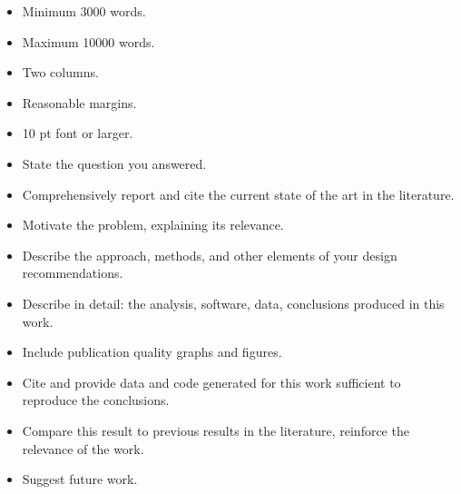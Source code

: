 \documentclass[12pts, answers]{exam}
\begin{document}
\begin{questions}
\begin{itemize}
\item Minimum 3000 words.
\item Maximum 10000 words.
\item Two columns.
\item Reasonable margins.
\item 10 pt font or larger.
\item State the question you answered.
\item Comprehensively report and cite the current state of the art in the literature.
\item Motivate the problem, explaining its relevance.
\item Describe the approach, methods, and other elements of your design recommendations.
\item Describe in detail: the analysis, software, data, conclusions produced in this work.
\item Include publication quality graphs and figures.
\item Cite and provide data and code generated for this work sufficient to reproduce the conclusions.
\item Compare this result to previous results in the literature, reinforce the relevance of the work. 
\item Suggest future work.
\end{itemize}

\end{questions}

%
%
\end{document}
